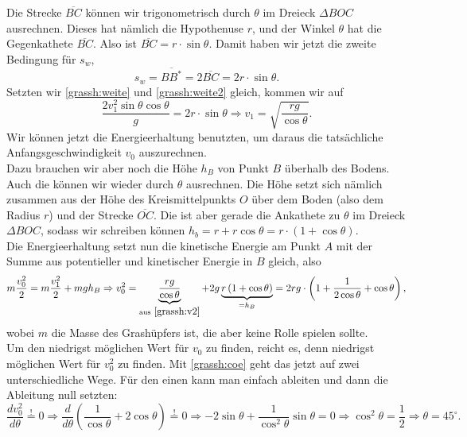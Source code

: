 \begin{Answer}[ref = grassh]
	Die Strecke $\overline{BC}$ können wir trigonometrisch durch $\theta$ im Dreieck $\Delta BOC$ ausrechnen. Dieses hat nämlich die Hypothenuse $r$, und der Winkel $\theta$ hat die Gegenkathete $\overline{BC}$. Also ist $\overline{BC} = r\cdot \sin \theta$. Damit haben wir jetzt die zweite Bedingung für $s_w$,
	\begin{equation}\label{grassh:weite2}
		s_w = \overline{BB^\ast} = 2 \overline{BC} = 2 r\cdot \sin \theta.
	\end{equation}
	Setzten wir \eqref{grassh:weite} und \eqref{grassh:weite2} gleich, kommen wir auf
	\begin{equation}\label{grassh:v2}
		\frac{2v_1^2\sin \theta \cos \theta}{g} = 2 r\cdot \sin \theta \Rightarrow v_1 = \sqrt{\frac{rg}{\cos\theta}}.
	\end{equation}
	Wir können jetzt die Energieerhaltung benutzten, um daraus die tatsächliche Anfangsgeschwindigkeit $v_0$ auszurechnen.\\
	Dazu brauchen wir aber noch die Höhe $h_B$ von Punkt $B$ überhalb des Bodens. Auch die können wir wieder durch $\theta$ ausrechnen. Die Höhe setzt sich nämlich zusammen aus der Höhe des Kreismittelpunkts $O$ über dem Boden (also dem Radius $r$) und der Strecke $\overline{OC}$. Die ist aber gerade die Ankathete zu $\theta$ im Dreieck $\Delta BOC$, sodass wir schreiben können $h_b = r + r\cos \theta = r\cdot\left(1+\cos \theta \right).$\\
	Die Energieerhaltung setzt nun die kinetische Energie am Punkt $A$ mit der Summe aus potentieller und kinetischer Energie in $B$ gleich, also
	\begin{equation}\label{grassh:coe}
		m\frac{v_0^2}{2} = m \frac{v_1^2}{2} + m g h_B\Rightarrow v_0^2 = \underbrace{\frac{rg}{\cos\theta}}_{\mathrm{aus}~\eqref{grassh:v2}} + 2g \underbrace{r\left(1+\cos \theta\right)}_{=h_B} =2 rg\cdot\left(1+\frac{1}{2\cos \theta}+ \cos \theta\right),
	\end{equation}
	wobei $m$ die Masse des Grashüpfers ist, die aber keine Rolle spielen sollte. \\
	Um den niedrigst möglichen  Wert für $v_0$ zu finden, reicht es, denn niedrigst möglichen Wert für $v_0^2$ zu finden. Mit \eqref{grassh:coe} geht das jetzt auf zwei unterschiedliche Wege. Für den einen kann man einfach ableiten und dann die Ableitung null setzten:
	\begin{equation}
		\frac{dv_0^2}{d\theta} \overset{!}{=} 0 \Rightarrow \frac{d}{d\theta}\left(\frac{1}{\cos \theta}+2\cos \theta\right)\overset{!}{=} 0\Rightarrow -2\sin \theta + \frac{1}{\cos^2 \theta} \sin \theta = 0 \Rightarrow \cos^2 \theta = \frac{1}{2} \Rightarrow \theta = 45^\circ.

\end{equation}
\end{Answer}
